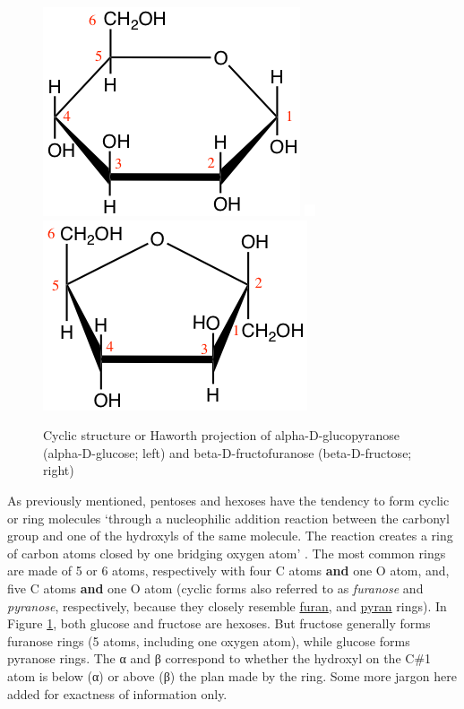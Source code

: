 \documentclass[]{book}
\theoremstyle{definition}
\theoremstyle{definition}
\theoremstyle{definition}
\theoremstyle{remark}
\begin{document}
\begin{figure}

{\centering \includegraphics[width=0.25\linewidth]{pictures/glucose-haworth} \includegraphics[width=0.25\linewidth]{pictures/blank} \includegraphics[width=0.25\linewidth]{pictures/fructose-haworth} 

}

\caption{Cyclic structure or Haworth projection of alpha-D-glucopyranose (alpha-D-glucose; left) and beta-D-fructofuranose (beta-D-fructose; right)}\label{fig:glucose-fructose}
\end{figure}

As previously mentioned, pentoses and hexoses have the tendency to form
cyclic or ring molecules `through a nucleophilic addition reaction
between the carbonyl group and one of the hydroxyls of the same
molecule. The reaction creates a ring of carbon atoms closed by one
bridging oxygen atom' \citep{Wikipedia_contributors2018-li}. The most
common rings are made of 5 or 6 atoms, respectively with four C atoms
\textbf{and} one O atom, and, five C atoms \textbf{and} one O atom
(cyclic forms also referred to as \emph{furanose} and \emph{pyranose},
respectively, because they closely resemble
\href{https://en.wikipedia.org/wiki/Furan}{furan}, and
\href{https://en.wikipedia.org/wiki/Pyran}{pyran} rings). In Figure
\ref{fig:glucose-fructose}, both glucose and fructose are hexoses. But
fructose generally forms furanose rings (5 atoms, including one oxygen
atom), while glucose forms pyranose rings. The α and β correspond to
whether the hydroxyl on the C\#1 atom is below (α) or above (β) the plan
made by the ring. Some more jargon here added for exactness of
information only.
\end{document}

